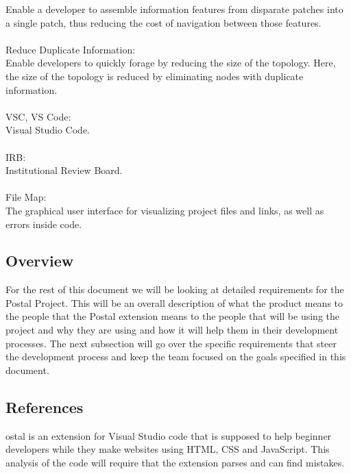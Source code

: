 \documentclass[letterpaper,10pt,titlepage,draftclsnofoot,onecolumn,onesided] {IEEEtran}
\begin{document}
Enable a developer to assemble information features from disparate patches into a single patch, thus reducing the cost of navigation between those features.\cite{iftwiki}\\\\
Reduce Duplicate Information: \\
Enable developers to quickly forage by reducing the size of the topology. Here, the size of the topology is reduced by eliminating nodes with duplicate information.\cite{iftwiki}\\\\
VSC, VS Code:\\
Visual Studio Code.\\\\
IRB: \\
Institutional Review Board.\\\\
File Map: \\
The graphical user interface for visualizing project files and links, as well as errors inside code.


\begingroup
\renewcommand{\section}[2]{\subsection{References}}


\endgroup

\subsection{Overview}
For the rest of this document we will be looking at detailed requirements for the Postal Project. 
This will be an overall description of what the product means to the people that the Postal extension means to the people that will be using the project and why they are using and how it will help them in their development processes. 
The next subsection will go over the specific requirements that steer the development process and keep the team focused on the goals specified in this document.   

\section{Overall Description}
Postal is an extension for Visual Studio code that is supposed to help beginner developers while they make websites using HTML, CSS and JavaScript. 
This analysis of the code will require that the extension parses and can find mistakes. 
\end{document}
